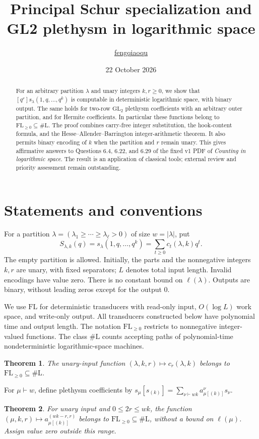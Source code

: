 \documentclass[11pt]{article}
\title{Principal Schur specialization and\protect\\ GL2 plethysm in logarithmic space}
\author{\href{https://github.com/fengqiaoqu}{fengqiaoqu}}
\date{22 October 2026}
\newtheorem{theorem}{Theorem}
\newcommand{\FL}{\mathrm{FL}}
\newcommand{\FLpos}{\mathrm{FL}_{\geq0}}
\newcommand{\sharpL}{\#\mathrm L}
\newcommand{\len}{\ell}
\begin{document}
\maketitle
\begin{abstract}
For an arbitrary partition $\lambda$ and unary integers $k,r\geq0$, we show
that $[q^r]s_\lambda(1,q,\ldots,q^k)$ is computable in deterministic
logarithmic space, with binary output. The same holds for two-row
$\mathrm{GL}_2$ plethysm coefficients with an arbitrary outer partition,
and for Hermite coefficients. In particular these functions belong to
$\FLpos\subseteq\sharpL$. The proof combines carry-free integer substitution,
the hook-content formula, and the Hesse--Allender--Barrington integer-arithmetic
theorem. It also permits binary encoding of $k$ when the partition and $r$
remain unary. This gives affirmative answers to Questions 6.4, 6.22, and 6.29
of the fixed v1 PDF of \emph{Counting in logarithmic space}. The result is an
application of classical tools; external review and priority assessment
remain outstanding.
\end{abstract}

\section{Statements and conventions}
For a partition $\lambda=(\lambda_1\geq\cdots\geq\lambda_\ell>0)$ of
size $w=|\lambda|$, put
\[
S_{\lambda,k}(q)=s_\lambda(1,q,\ldots,q^k)
=\sum_{t\geq0}c_t(\lambda,k)q^t.
\]
The empty partition is allowed. Initially, the parts and the nonnegative
integers $k,r$ are unary, with fixed separators; $L$ denotes total input
length. Invalid encodings have value zero. There is no constant bound on
$\len(\lambda)$. Outputs are binary, without leading zeros except for the
output $0$.

We use $\FL$ for deterministic transducers with read-only input,
$O(\log L)$ work space, and write-only output. All transducers constructed
below have polynomial time and output length. The notation $\FLpos$
restricts to nonnegative integer-valued functions. The class $\sharpL$
counts accepting paths of polynomial-time nondeterministic logarithmic-space
machines.

\begin{theorem}\label{thm:main}
The unary-input function $(\lambda,k,r)\mapsto c_r(\lambda,k)$ belongs to
$\FLpos\subseteq\sharpL$.
\end{theorem}

For $\mu\vdash w$, define plethysm coefficients by
$s_\mu[s_{(k)}]=\sum_{\nu\vdash wk}a_{\mu[(k)]}^{\nu}s_\nu$.
\begin{theorem}\label{thm:pleth}
For unary input and $0\leq2r\leq wk$, the function
$(\mu,k,r)\mapsto a_{\mu[(k)]}^{(wk-r,r)}$ belongs to
$\FLpos\subseteq\sharpL$, without a bound on $\len(\mu)$.
Assign value zero outside this range.
\end{theorem}
\end{document}
